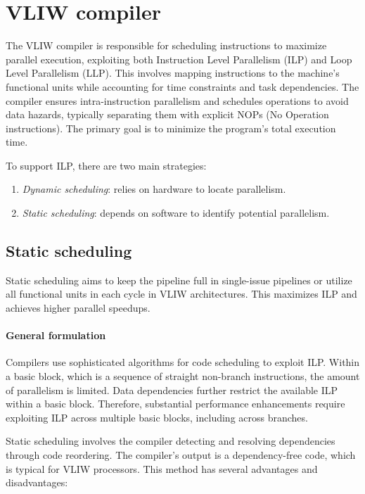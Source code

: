 \section{VLIW compiler}

The VLIW compiler is responsible for scheduling instructions to maximize parallel execution, exploiting both Instruction Level Parallelism (ILP) and Loop Level Parallelism (LLP).
This involves mapping instructions to the machine's functional units while accounting for time constraints and task dependencies. 
The compiler ensures intra-instruction parallelism and schedules operations to avoid data hazards, typically separating them with explicit NOPs (No Operation instructions). 
The primary goal is to minimize the program's total execution time.

To support ILP, there are two main strategies:
\begin{enumerate}
    \item \textit{Dynamic scheduling}: relies on hardware to locate parallelism.
    \item \textit{Static scheduling}: depends on software to identify potential parallelism.
\end{enumerate}

\subsection{Static scheduling}
Static scheduling aims to keep the pipeline full in single-issue pipelines or utilize all functional units in each cycle in VLIW architectures. 
This maximizes ILP and achieves higher parallel speedups.

\paragraph*{General formulation}
Compilers use sophisticated algorithms for code scheduling to exploit ILP. 
Within a basic block, which is a sequence of straight non-branch instructions, the amount of parallelism is limited. 
Data dependencies further restrict the available ILP within a basic block. 
Therefore, substantial performance enhancements require exploiting ILP across multiple basic blocks, including across branches.

Static scheduling involves the compiler detecting and resolving dependencies through code reordering.
The compiler's output is a dependency-free code, which is typical for VLIW processors. 
This method has several advantages and disadvantages:

